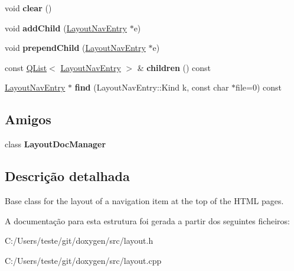 \begin{DoxyCompactItemize}
\item 
\hypertarget{struct_layout_nav_entry_ac8bb3912a3ce86b15842e79d0b421204}{void {\bfseries clear} ()}\label{struct_layout_nav_entry_ac8bb3912a3ce86b15842e79d0b421204}

\item 
\hypertarget{struct_layout_nav_entry_afedaca377f98b816c27447ad30e92f77}{void {\bfseries add\-Child} (\hyperlink{struct_layout_nav_entry}{Layout\-Nav\-Entry} $\ast$e)}\label{struct_layout_nav_entry_afedaca377f98b816c27447ad30e92f77}

\item 
\hypertarget{struct_layout_nav_entry_a8c7fd25e523c314739c516c3fa028f2c}{void {\bfseries prepend\-Child} (\hyperlink{struct_layout_nav_entry}{Layout\-Nav\-Entry} $\ast$e)}\label{struct_layout_nav_entry_a8c7fd25e523c314739c516c3fa028f2c}

\item 
\hypertarget{struct_layout_nav_entry_ad023a2b72cfbfd45b3f4ec65c2953667}{const \hyperlink{class_q_list}{Q\-List}$<$ \hyperlink{struct_layout_nav_entry}{Layout\-Nav\-Entry} $>$ \& {\bfseries children} () const }\label{struct_layout_nav_entry_ad023a2b72cfbfd45b3f4ec65c2953667}

\item 
\hypertarget{struct_layout_nav_entry_accc2741668a42b0d2f4a41ff6c095cee}{\hyperlink{struct_layout_nav_entry}{Layout\-Nav\-Entry} $\ast$ {\bfseries find} (Layout\-Nav\-Entry\-::\-Kind k, const char $\ast$file=0) const }\label{struct_layout_nav_entry_accc2741668a42b0d2f4a41ff6c095cee}

\end{DoxyCompactItemize}
\subsection*{Amigos}
\begin{DoxyCompactItemize}
\item 
\hypertarget{struct_layout_nav_entry_af6431c54f9737e0168be5926d2d9b5e9}{class {\bfseries Layout\-Doc\-Manager}}\label{struct_layout_nav_entry_af6431c54f9737e0168be5926d2d9b5e9}

\end{DoxyCompactItemize}


\subsection{Descrição detalhada}
Base class for the layout of a navigation item at the top of the H\-T\-M\-L pages. 

A documentação para esta estrutura foi gerada a partir dos seguintes ficheiros\-:\begin{DoxyCompactItemize}
\item 
C\-:/\-Users/teste/git/doxygen/src/layout.\-h\item 
C\-:/\-Users/teste/git/doxygen/src/layout.\-cpp\end{DoxyCompactItemize}

